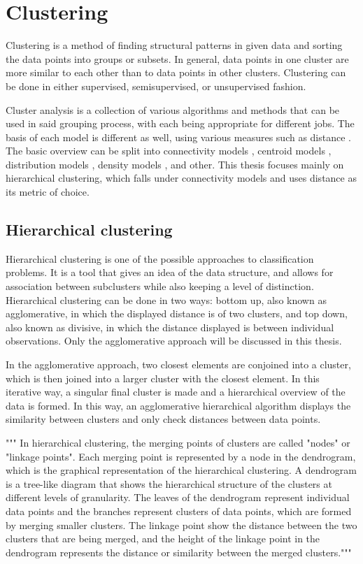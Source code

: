 \chapter{Clustering}
\label{chap:clustering}
Clustering is a method of finding structural patterns in given data and sorting the data points into groups or subsets. In general, data points in one cluster are more similar to each other than to data points in other clusters. Clustering can be done in either supervised, semisupervised, or unsupervised fashion. 

Cluster analysis is a collection of various algorithms and methods that can be used in said grouping process, with each being appropriate for different jobs. The basis of each model is different as well, using various measures such as distance \citep{murtagh2017algorithms, hsu2007hierarchical}. The basic overview can be split into connectivity models \citep{fischer2003clustering}, centroid models \citep{morissette2013k, sun2014parallel}, distribution models \citep{jimenez2019extensions, bocchieri2001subspace}, density models \citep{campello2020density}, and other. This thesis focuses mainly on hierarchical clustering, which falls under connectivity models and uses distance as its metric of choice. 

\section{Hierarchical clustering}
\label{sec:hierarchicalclustering}
Hierarchical clustering is one of the possible approaches to classification problems. It is a tool that gives an idea of the data structure, and allows for association between subclusters while also keeping a level of distinction. Hierarchical clustering can be done in two ways: bottom up, also known as agglomerative, in which the displayed distance is of two clusters, and top down, also known as divisive, in which the distance displayed is between individual observations. Only the agglomerative approach will be discussed in this thesis. 

In the agglomerative approach, two closest elements are conjoined into a cluster, which is then joined into a larger cluster with the closest element. In this iterative way, a singular final cluster is made and a hierarchical overview of the data is formed. In this way, an agglomerative hierarchical algorithm displays the similarity between clusters and only check distances between data points.


"""
In hierarchical clustering, the merging points of clusters are called "nodes" or "linkage points".
Each merging point is represented by a node in the dendrogram, which is the graphical representation of the hierarchical clustering.
A dendrogram is a tree-like diagram that shows the hierarchical structure of the clusters at different levels of granularity. The leaves of the dendrogram represent individual data points and the branches represent clusters of data points, which are formed by merging smaller clusters.
The linkage point show the distance between the two clusters that are being merged, and the height of the linkage point in the dendrogram represents the distance or similarity between the merged clusters."""

